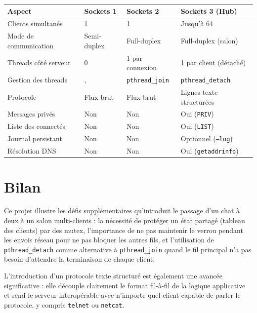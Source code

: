 \documentclass[12pt,a4paper]{article}
\begin{document}
\begin{center}
\begin{tabular}{@{}llll@{}}
\toprule
Aspect & Sockets 1 & Sockets 2 & Sockets 3 (Hub) \\
\midrule
Clients simultanés & 1 & 1 & Jusqu'à 64 \\
Mode de communication & Semi-duplex & Full-duplex & Full-duplex (salon) \\
Threads côté serveur & 0 & 1 par connexion & 1 par client (détaché) \\
Gestion des threads &, & \texttt{pthread\_join} & \texttt{pthread\_detach} \\
Protocole & Flux brut & Flux brut & Lignes texte structurées \\
Messages privés & Non & Non & Oui (\texttt{PRIV}) \\
Liste des connectés & Non & Non & Oui (\texttt{LIST}) \\
Journal persistant & Non & Non & Optionnel (\texttt{--log}) \\
Résolution DNS & Non & Non & Oui (\texttt{getaddrinfo}) \\
\bottomrule
\end{tabular}
\end{center}

\section{Bilan}

Ce projet illustre les défis supplémentaires qu'introduit le passage d'un chat
à deux à un salon multi-clients : la nécessité de protéger un état partagé
(tableau des clients) par des mutex, l'importance de ne pas maintenir le verrou
pendant les envois réseau pour ne pas bloquer les autres fils, et l'utilisation
de \texttt{pthread\_detach} comme alternative à \texttt{pthread\_join} quand le
fil principal n'a pas besoin d'attendre la terminaison de chaque client.

L'introduction d'un protocole texte structuré est également une avancée
significative : elle découple clairement le format fil-à-fil de la logique
applicative et rend le serveur interopérable avec n'importe quel client
capable de parler le protocole, y compris \texttt{telnet} ou \texttt{netcat}.
\end{document}
